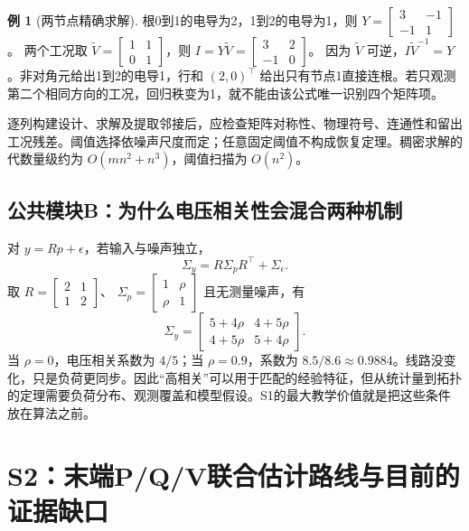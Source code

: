 \documentclass[UTF8,11pt,fontset=fandol,openany,oneside]{ctexbook}
\theoremstyle{definition}
\newtheorem{example}[theorem]{例}
\theoremstyle{remark}
\numberwithin{equation}{chapter}
\begin{document}
\begin{example}[两节点精确求解]
根0到1的电导为2，1到2的电导为1，则
$Y=\left[\begin{smallmatrix}3&-1\\-1&1\end{smallmatrix}\right]$。
两个工况取 $\widetilde V=\left[\begin{smallmatrix}1&1\\0&1\end{smallmatrix}\right]$，则
$I=Y\widetilde V=\left[\begin{smallmatrix}3&2\\-1&0\end{smallmatrix}\right]$。
因为 $\widetilde V$ 可逆，$I\widetilde V^{-1}=Y$。非对角元给出1到2的电导1，行和 $(2,0)^\top$ 给出只有节点1直接连根。若只观测第二个相同方向的工况，回归秩变为1，就不能由该公式唯一识别四个矩阵项。
\end{example}
逐列构建设计、求解及提取邻接后，应检查矩阵对称性、物理符号、连通性和留出工况残差。阈值选择依噪声尺度而定；任意固定阈值不构成恢复定理。稠密求解的代数量级约为 $O(mn^2+n^3)$，阈值扫描为 $O(n^2)$。

\subsection{公共模块B：为什么电压相关性会混合两种机制}
对 $y=Rp+\epsilon$，若输入与噪声独立，
\begin{equation}
 \Sigma_y=R\Sigma_pR^\top+\Sigma_\epsilon.
\end{equation}
取 $R=\left[\begin{smallmatrix}2&1\\1&2\end{smallmatrix}\right]$、
$\Sigma_p=\left[\begin{smallmatrix}1&\rho\\\rho&1\end{smallmatrix}\right]$ 且无测量噪声，有
\begin{equation}
 \Sigma_y=\begin{bmatrix}5+4\rho&4+5\rho\\4+5\rho&5+4\rho\end{bmatrix}.
\end{equation}
当 $\rho=0$，电压相关系数为 $4/5$；当 $\rho=0.9$，系数为 $8.5/8.6\approx0.9884$。线路没变化，只是负荷更同步。因此“高相关”可以用于匹配的经验特征，但从统计量到拓扑的定理需要负荷分布、观测覆盖和模型假设。S1的最大教学价值就是把这些条件放在算法之前。

\section{S2：末端P/Q/V联合估计路线与目前的证据缺口}
\end{document}
